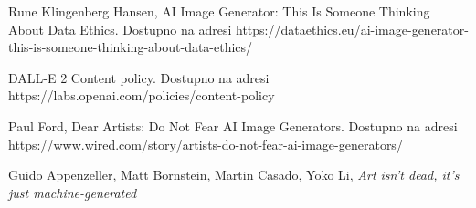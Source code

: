 \documentclass[12pt, letterpaper]{article}
\begin{document}
\begin{thebibliography}{10}
 Rune Klingenberg Hansen, AI Image Generator: This Is Someone Thinking About Data Ethics. Dostupno na adresi https://dataethics.eu/ai-image-generator-this-is-someone-thinking-about-data-ethics/

 DALL-E 2 Content policy. Dostupno na adresi https://labs.openai.com/policies/content-policy

 Paul Ford, Dear Artists: Do Not Fear AI Image Generators. Dostupno na adresi https://www.wired.com/story/artists-do-not-fear-ai-image-generators/

 Guido Appenzeller, Matt Bornstein, Martin Casado, Yoko Li, \textit{Art isn't dead, it's just machine-generated}

\end{thebibliography}
\end{document}
